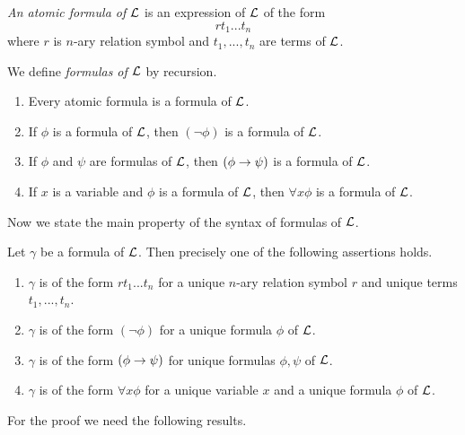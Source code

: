 \begin{definition}
\textit{An atomic formula of ${\mathcal L}$} is an expression of ${\mathcal L}$ of the form
$$rt_1...t_n$$
where $r$ is $n$-ary relation symbol and $t_1, ...,t_n$ are terms of ${\mathcal L}$.
\end{definition}

\begin{definition}
We define \textit{formulas of ${\mathcal L}$} by recursion.
\begin{enumerate}[label=\textbf{(\arabic*)}, leftmargin=3.0em]
\item Every atomic formula is a formula of ${\mathcal L}$.
\item If $\phi$ is a formula of ${\mathcal L}$, then $(\neg \phi)$ is a formula of ${\mathcal L}$.
\item If $\phi$ and $\psi$ are formulas of ${\mathcal L}$, then $(\phi\rightarrow \psi)$ is a formula of ${\mathcal L}$.
\item If $x$ is a variable and $\phi$ is a formula of ${\mathcal L}$, then $\forall x\phi$ is a formula of ${\mathcal L}$.
\end{enumerate}
\end{definition}
\noindent
Now we state the main property of the syntax of formulas of ${\mathcal L}$.

\begin{theorem}\label{theorem:unique_readability_of_formulas}
Let $\gamma$ be a formula of ${\mathcal L}$. Then precisely one of the following assertions holds.
\begin{enumerate}[label=\textbf{\emph{(\arabic*)}}, leftmargin=3.0em]
\item $\gamma$ is of the form $rt_1...t_n$ for a unique $n$-ary relation symbol $r$ and unique terms $t_1 , ..., t_n$.
\item $\gamma$ is of the form $(\neg \phi)$ for a unique formula $\phi$ of ${\mathcal L}$.
\item $\gamma$ is of the form $(\phi \rightarrow \psi)$ for unique formulas $\phi, \psi$ of ${\mathcal L}$.
\item $\gamma$ is of the form $\forall x \phi$ for a unique variable $x$ and a unique formula $\phi$ of ${\mathcal L}$.
\end{enumerate}
\end{theorem}
\noindent
For the proof we need the following results.

